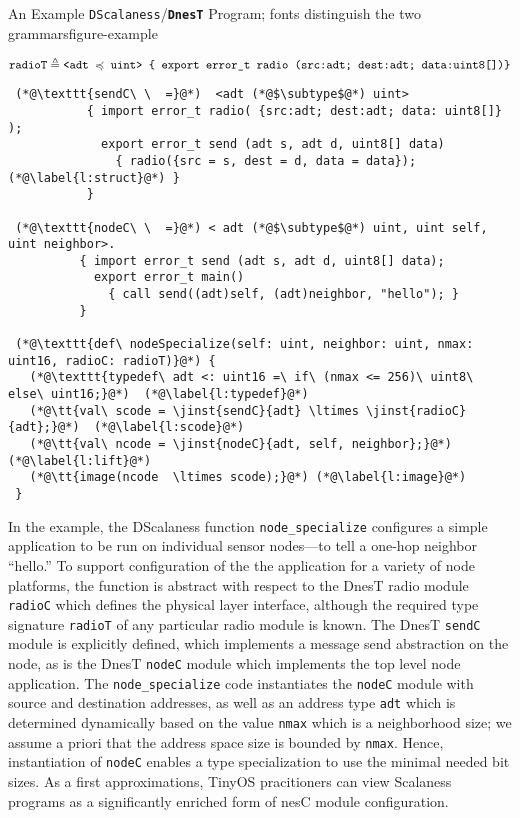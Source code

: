 \begin{fpfig*}[t]{An Example \texttt{DScalaness}/{\bf \texttt{DnesT}} Program; fonts distinguish the two grammars}{figure-example}
\lstset{numbers=left, numberstyle=\tiny, stepnumber=1, numbersep=5pt, basicstyle=\ttfamily} 

{\scriptsize\bf
$$
\texttt{radioT} \triangleq \texttt{<adt $\preccurlyeq$ uint> \{ export error\_t radio ({src:adt; dest:adt; data:uint8[]})\}} 
$$
\begin{lstlisting}
 (*@\texttt{sendC\ \  =}@*)  <adt (*@$\subtype$@*) uint>  
           { import error_t radio( {src:adt; dest:adt; data: uint8[]} );       
             export error_t send (adt s, adt d, uint8[] data) 
               { radio({src = s, dest = d, data = data}); (*@\label{l:struct}@*) }
           }
 
 (*@\texttt{nodeC\ \  =}@*) < adt (*@$\subtype$@*) uint, uint self, uint neighbor>.
          { import error_t send (adt s, adt d, uint8[] data); 
            export error_t main() 
              { call send((adt)self, (adt)neighbor, "hello"); }   
          }
 
 (*@\texttt{def\ nodeSpecialize(self: uint, neighbor: uint, nmax: uint16, radioC: radioT)}@*) {
   (*@\texttt{typedef\ adt <: uint16 =\ if\ (nmax <= 256)\ uint8\ else\ uint16;}@*)  (*@\label{l:typedef}@*)   
   (*@\tt{val\ scode = \jinst{sendC}{adt} \ltimes \jinst{radioC}{adt};}@*)  (*@\label{l:scode}@*)    
   (*@\tt{val\ ncode = \jinst{nodeC}{adt, self, neighbor};}@*) (*@\label{l:lift}@*)    
   (*@\tt{image(ncode  \ltimes scode);}@*) (*@\label{l:image}@*)   
 }
\end{lstlisting}
}
\end{fpfig*}

In the example, the DScalaness function \texttt{node\_specialize} configures a simple application
to be run on individual sensor nodes---to tell a one-hop neighbor ``hello.'' To support
configuration of the the application for a variety of node platforms, the function is abstract
with respect to the DnesT radio module \texttt{radioC} which defines the physical layer
interface, although the required type signature \texttt{radioT} of any particular radio module
is known. The DnesT \texttt{sendC} module is explicitly defined, which implements a message send
abstraction on the node, as is the DnesT \texttt{nodeC} module which implements the top level
node application. The \texttt{node\_specialize} code instantiates the \texttt{nodeC} module with
source and destination addresses, as well as an address type \texttt{adt} which is determined
dynamically based on the value \texttt{nmax} which is a neighborhood size; we assume a priori
that the address space size is bounded by \texttt{nmax}. Hence, instantiation of \texttt{nodeC}
enables a type specialization to use the minimal needed bit sizes. As a first approximations,
TinyOS pracitioners can view Scalaness programs as a significantly enriched form of nesC module
configuration.


